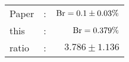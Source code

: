       \begin{tabular}{lcr}
          Paper &:& $\mathrm{Br}  = 0.1\pm 0.03\%$ \\
          this      &:& $\mathrm{Br}  = 0.379\%$ \\
		  ratio   &:& $3.786\pm 1.136$ \\
      \end{tabular}
